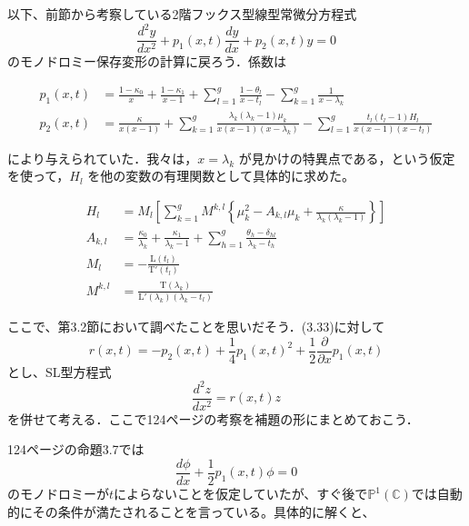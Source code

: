 \documentclass[paper=a4, fontsize=11pt]{jlreq} %
\newenvironment{story}{%
  \begin{mdframed}[
    backgroundcolor=red!5, %
    linewidth=0pt,         %
    innertopmargin=10pt,   %
    innerbottommargin=10pt,
    innerrightmargin=10pt, %
    innerleftmargin=10pt
  ]%
}{%
  \end{mdframed}%
}
\theoremstyle{break}
\theoremstyle{qa}
\begin{document}
\begin{story}
以下、前節から考察している2階フックス型線型常微分方程式
\begin{equation}
    \frac{d^2 y}{dx^2} + p_1(x,t) \frac{dy}{dx} + p_2(x,t)y = 0 \label{eq:3.33}
\end{equation}
のモノドロミー保存変形の計算に戻ろう．係数は
\end{story}
\begin{align}
p_1(x,t) &= \frac{1-\kappa_0}{x} + \frac{1-\kappa_1}{x-1} + \sum_{l=1}^g \frac{1-\theta_l}{x-t_l} - \sum_{k=1}^g \frac{1}{x-\lambda_k} \label{eq:3.67} \\
p_2(x,t) &= \frac{\kappa}{x(x-1)} + \sum_{k=1}^g \frac{\lambda_k(\lambda_k-1)\mu_k}{x(x-1)(x-\lambda_k)} - \sum_{l=1}^g \frac{t_l(t_l-1)H_l}{x(x-1)(x-t_l)} \label{eq:3.68}
\end{align}
\begin{story}
により与えられていた．我々は，$x=\lambda_k$ が見かけの特異点である，という仮定を使って，$H_l$ を他の変数の有理関数として具体的に求めた。
\end{story}
\begin{align}
H_l &= M_l \left[ \sum_{k=1}^g M^{k,l} \left\{ \mu_k^2 - A_{k,l}\mu_k + \frac{\kappa}{\lambda_k(\lambda_k-1)} \right\} \right] \label{eq:3.73}\\
A_{k,l} &= \frac{\kappa_0}{\lambda_k} + \frac{\kappa_1}{\lambda_k-1} + \sum_{h=1}^g \frac{\theta_h - \delta_{hl}}{\lambda_k - t_h}\\
M_l &= - \frac{\mathrm{L}(t_l)}{\mathrm{T}'(t_l)} \label{eq:3.74} \\
M^{k,l} &= \frac{\mathrm{T}(\lambda_k)}{\mathrm{L}'(\lambda_k)(\lambda_k - t_l)} \label{eq:3.75}
\end{align}
\begin{story}
ここで、第3.2節において調べたことを思いだそう．(3.33)に対して
\begin{equation}
    r(x,t) = -p_2(x,t) + \frac{1}{4}p_1(x,t)^2 + \frac{1}{2}\frac{\partial}{\partial x}p_1(x,t) \label{eq:3.32}
\end{equation}
とし、SL型方程式
\begin{equation}
    \frac{d^2 z}{dx^2} = r(x,t)z
\end{equation}
を併せて考える．ここで124ページの考察を補題の形にまとめておこう．
\end{story}
124ページの命題3.7では
\[
\frac{d\phi}{dx}+\frac{1}{2}p_{1}(x,t)\phi=0
\]
のモノドロミーが$t$によらないことを仮定していたが、すぐ後で$\mathbb{P}^{1}(\mathbb{C})$では自動的にその条件が満たされることを言っている。具体的に解くと、
\end{document}

